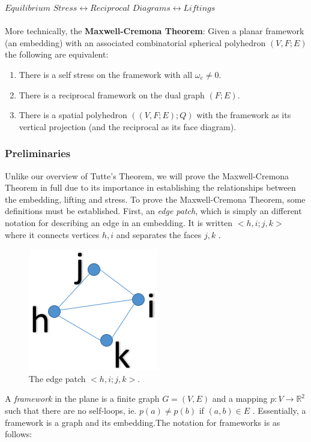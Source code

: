 \documentclass[11pt]{article}
\newcommand{\R}{\mathbb{R}}
\theoremstyle{definition}
\begin{document}
 $Equilibrium$  $Stress \leftrightarrow Reciprocal$ $Diagrams \leftrightarrow Liftings$ \\
\\
More technically, the \textbf{Maxwell-Cremona Theorem}: Given a planar framework (an embedding) with an associated combinatorial spherical polyhedron $(V,F;E)$ the following are equivalent:
\begin{enumerate}
	\item There is a self stress on the framework with all $\omega_e \neq 0$.
	\item There is a reciprocal framework on the dual graph $(F;E)$.
	\item There is a spatial polyhedron $((V,F;E);Q)$ with the framework as its vertical projection (and the reciprocal as its face diagram).
 \end{enumerate}

 
\subsubsection{Preliminaries}
Unlike our overview of Tutte's Theorem, we will prove the Maxwell-Cremona Theorem in full due to its importance in establishing the relationships between the embedding, lifting and stress. To prove the Maxwell-Cremona Theorem, some definitions must be established. First, an \emph{edge patch}, which is simply an different notation for describing an edge in an embedding. It is written $<h,i;j,k>$ where it connects vertices $h,i$ and separates the faces $j,k$ \cite{mccProof}.

\begin{figure}
  \begin{center}
  		\includegraphics[width=.23\textwidth]{edge_patch2}
  \end{center}
  \caption{The edge patch $<h,i;j,k>$.}
\end{figure}
  
A \emph{framework} in the plane is a finite graph $G=(V,E)$ and a mapping $p: V \rightarrow \R^2$ such that there are no self-loops, ie. $p(a) \neq p(b)$ if $(a,b) \in E$ \cite{mccProof}. Essentially, a framework is a graph and its embedding.The notation for frameworks is as follows: 
\end{document}
